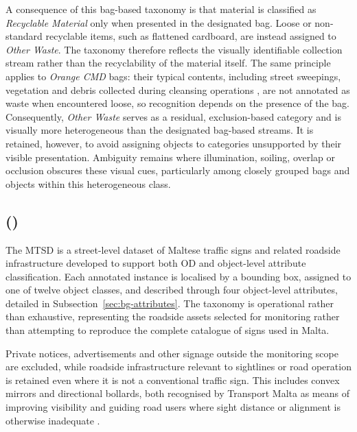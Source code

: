 \noindent A consequence of this bag-based taxonomy is that material is classified as \emph{Recyclable Material} only when presented in the designated bag. Loose or non-standard recyclable items, such as flattened cardboard, are instead assigned to \emph{Other Waste}. The taxonomy therefore reflects the visually identifiable collection stream rather than the recyclability of the material itself. The same principle applies to \emph{Orange \gls{CMD}} bags: their typical contents, including street sweepings, vegetation and debris collected during cleansing operations \cite{cmd2026web}, are not annotated as waste when encountered loose, so recognition depends on the presence of the bag. Consequently, \emph{Other Waste} serves as a residual, exclusion-based category and is visually more heterogeneous than the designated bag-based streams. It is retained, however, to avoid assigning objects to categories unsupported by their visible presentation. Ambiguity remains where illumination, soiling, overlap or occlusion obscures these visual cues, particularly among closely grouped bags and objects within this heterogeneous class.

\subsection{ ()}
\label{sec:bg-mtsd}
The \gls{MTSD} is a street-level dataset of Maltese traffic signs and related roadside infrastructure developed to support both \gls{OD} and object-level attribute classification. Each annotated instance is localised by a bounding box, assigned to one of twelve object classes, and described through four object-level attributes, detailed in Subsection~\ref{sec:bg-attributes}. The taxonomy is operational rather than exhaustive, representing the roadside assets selected for monitoring rather than attempting to reproduce the complete catalogue of signs used in Malta.

Private notices, advertisements and other signage outside the monitoring scope are excluded, while roadside infrastructure relevant to sightlines or road operation is retained even where it is not a conventional traffic sign. This includes convex mirrors and directional bollards, both recognised by Transport Malta as means of improving visibility and guiding road users where sight distance or alignment is otherwise inadequate \cite{BG27-malta-road-mirrors}.

